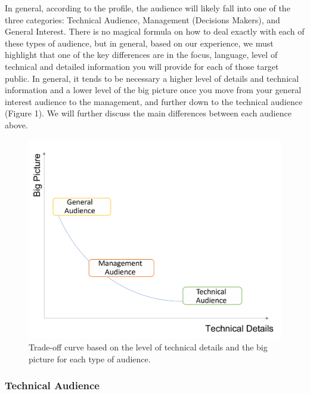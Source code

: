 \documentclass[
]{book}
\begin{document}
In general, according to the profile, the audience will likely fall into one of the three categories: Technical Audience, Management (Decisions Makers), and General Interest. There is no magical formula on how to deal exactly with each of these types of audience, but in general, based on our experience, we must highlight that one of the key differences are in the focus, language, level of technical and detailed information you will provide for each of those target public. In general, it tends to be necessary a higher level of details and technical information and a lower level of the big picture once you move from your general interest audience to the management, and further down to the technical audience (Figure 1). We will further discuss the main differences between each audience above.

\begin{figure}

{\centering \includegraphics[width=13.08in]{images/trade-off_value_delivery} 

}

\caption{Trade-off curve based on the level of technical details and the big picture for each type of audience.}\label{fig:trade-off}
\end{figure}

\hypertarget{technical-audience}{%
\subsubsection{Technical Audience}\label{technical-audience}}
\end{document}

